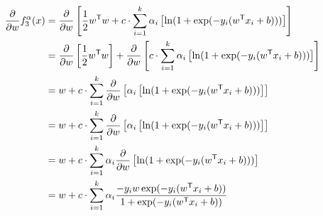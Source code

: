 \documentclass[12pt,landscape]{article}
\newcommand{\tr}{^\mathsf{T}}
\begin{document}
\begin{align*}
\frac{\partial}{\partial w} f^{\alpha}_3(x) &= \frac{\partial}{\partial w} \left[  \frac{1}{2} w\tr w +c \cdot \sum\limits_{i=1}^k \alpha_i \left[ \ln(\zLog)\right] \right]\\
&= \frac{\partial}{\partial w} \left[  \frac{1}{2} w\tr w \right] + \frac{\partial}{\partial w} \left[  c \cdot \sum\limits_{i=1}^k \alpha_i \left[\ln(\zLog)\right] \right]\\
&=  w  +  c \cdot \sum\limits_{i=1}^k \frac{\partial}{\partial w} \left[  \alpha_i \left[\ln(\zLog)\right] \right]\\
&=  w  +  c \cdot \sum\limits_{i=1}^k \frac{\partial}{\partial w} \left[  \alpha_i \left[\ln(\zLog)\right] \right]\\
&=  w  +  c \cdot \sum\limits_{i=1}^k \alpha_i  \frac{\partial}{\partial w}  \left[\ln(\zLog)\right] \\
&=  w  +  c \cdot \sum\limits_{i=1}^k \alpha_i  \frac{ -y_i w\exp(-y_i(w\tr x_i + b)) }{\zLog}\\
\end{align*}



%
\end{document}
